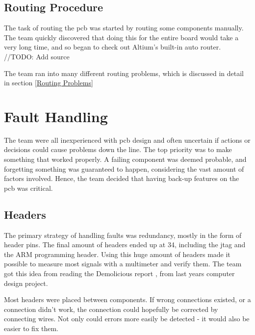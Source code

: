 \subsection{Routing Procedure}
The task of routing the \gls{pcb} was started by routing some components manually. 
The team quickly discovered that doing this for the entire board would take a very long time, and so began to check out Altium's built-in auto router. 
//TODO: Add source

The team ran into many different routing problems, which is discussed in detail in section \ref{Routing Problems}

\section{Fault Handling}
The team were all inexperienced with \gls{pcb} design and often uncertain if actions or decisions could cause problems down the line. 
The top priority was to make something that worked properly. 
A failing component was deemed probable, and forgetting something was guaranteed to happen, considering the vast amount of factors involved. 
Hence, the team decided that having back-up features on the \gls{pcb} was critical.

\subsection{Headers}
The primary strategy of handling faults was redundancy, mostly in the form of header pins. 
The final amount of headers ended up at 34, including the \gls{jtag} and the ARM programming header. 
Using this huge amount of headers made it possible to measure most signals with a multimeter and verify them. 
The team got this idea from reading the Demolicious report \cite{demolicious-report}, from last years computer design project. 

Most headers were placed between components. 
If wrong connections existed, or a connection didn't work, the connection could hopefully be corrected by connecting wires. 
Not only could errors more easily be detected - it would also be easier to fix them.

